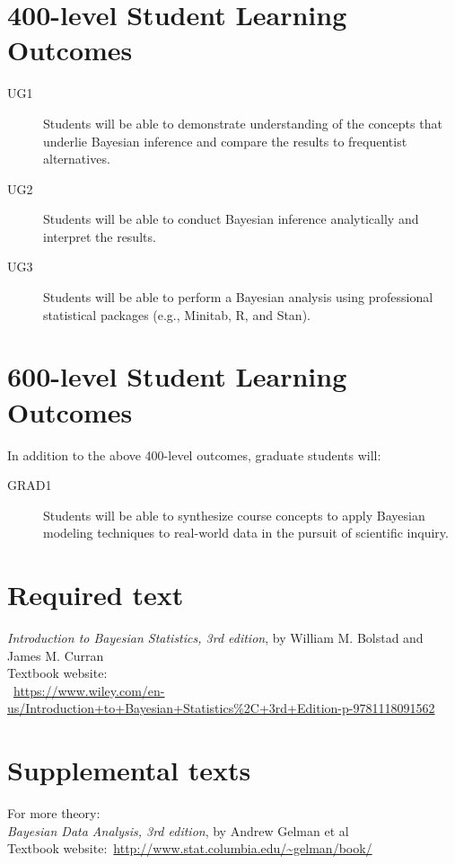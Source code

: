 \documentclass[11pt,onecolumn]{article}
\begin{document}
\section*{400-level Student Learning Outcomes}
\begin{description}
\item[UG1] Students will be able to demonstrate understanding of the concepts that underlie Bayesian inference and compare the results to frequentist alternatives.
\item[UG2] Students will be able to conduct Bayesian inference analytically and interpret the results.
\item[UG3] Students will be able to perform a Bayesian analysis using professional statistical packages (e.g., \textsf{Minitab}, \textsf{R}, and \textsf{Stan}).
\end{description}

\section*{600-level Student Learning Outcomes}
In addition to the above 400-level outcomes, graduate students will:
\begin{description}
\item[GRAD1] Students will be able to synthesize course concepts to apply Bayesian modeling techniques to real-world data in the pursuit of scientific inquiry.
\end{description}

\section*{Required text}
\emph{Introduction to Bayesian Statistics, 3rd edition}, by William M. Bolstad and James M. Curran\\
Textbook website:\\~\url{https://www.wiley.com/en-us/Introduction+to+Bayesian+Statistics%2C+3rd+Edition-p-9781118091562}

\section*{Supplemental texts}

For more theory:\\
\emph{Bayesian Data Analysis, 3rd edition}, by Andrew Gelman et al\\
Textbook website:~\url{http://www.stat.columbia.edu/~gelman/book/}\\
\end{document}
